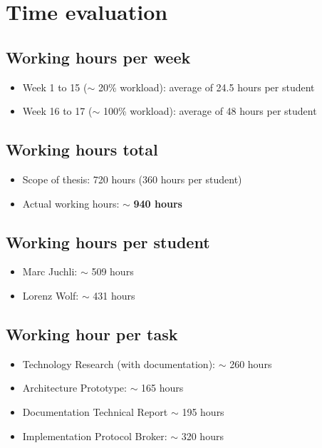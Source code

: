 \section*{Time evaluation}

\subsection*{Working hours per week}
\begin{itemize}
    \item Week 1 to 15 ($\sim$ 20\% workload): average of 24.5 hours per student
    \item Week 16 to 17 ($\sim$ 100\% workload): average of 48 hours per student
\end{itemize}

\subsection*{Working hours total}
\begin{itemize}
    \item Scope of thesis: 720 hours (360 hours per student)
    \item Actual working hours: $\sim$ \textbf{940 hours}
\end{itemize}

\subsection*{Working hours per student}
\begin{itemize}
    \item Marc Juchli: $\sim$ 509 hours 
    \item Lorenz Wolf: $\sim$ 431 hours
\end{itemize}

\subsection*{Working hour per task}
\begin{itemize}
    \item Technology Research (with documentation): $\sim$  260 hours
    \item Architecture Prototype: $\sim$ 165 hours
    \item Documentation Technical Report $\sim$ 195 hours 
    \item Implementation Protocol Broker: $\sim$ 320 hours 
\end{itemize}

